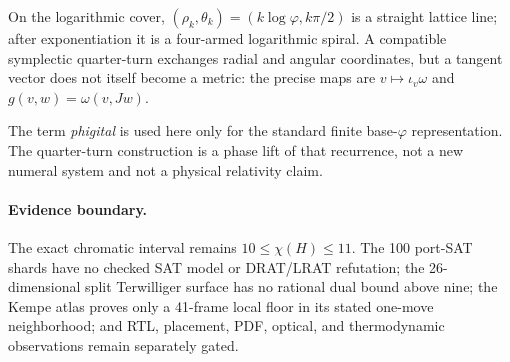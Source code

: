 On the logarithmic cover, $(\rho_k,\theta_k)=(k\log\varphi,k\pi/2)$ is a straight lattice line; after exponentiation it is a four-armed logarithmic spiral. A compatible symplectic quarter-turn exchanges radial and angular coordinates, but a tangent vector does not itself become a metric: the precise maps are $v\mapsto\iota_v\omega$ and $g(v,w)=\omega(v,Jw)$.

The term \emph{phigital} is used here only for the standard finite base-$\varphi$ representation. The quarter-turn construction is a phase lift of that recurrence, not a new numeral system and not a physical relativity claim.

\paragraph{Evidence boundary.}
The exact chromatic interval remains $10\leq\chi(H)\leq11$. The 100 port-SAT shards have no checked SAT model or DRAT/LRAT refutation; the 26-dimensional split Terwilliger surface has no rational dual bound above nine; the Kempe atlas proves only a 41-frame local floor in its stated one-move neighborhood; and RTL, placement, PDF, optical, and thermodynamic observations remain separately gated.
